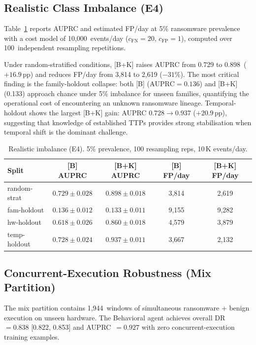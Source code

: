 \documentclass[journal]{IEEEtran}
\begin{document}
\subsection{Realistic Class Imbalance (E4)}
\label{subsec:e4}

Table~\ref{tab:imbalance} reports AUPRC and estimated FP/day at 5\% ransomware prevalence
with a cost model of 10,000~events/day ($c_{\mathrm{FN}}=20$, $c_{\mathrm{FP}}=1$),
computed over 100~independent resampling repetitions.

Under random-stratified conditions, {[}B{+}K{]} raises AUPRC from 0.729 to
0.898~($+16.9$\,pp) and reduces FP/day from 3,814 to 2,619 ($-31\%$).
The most critical finding is the family-holdout collapse: both {[}B{]}
($\mathrm{AUPRC}=0.136$) and {[}B{+}K{]} (0.133) approach chance under 5\% imbalance
for unseen families, quantifying the operational cost of encountering an unknown
ransomware lineage.
Temporal-holdout shows the largest {[}B{+}K{]} gain: AUPRC $0.728 \to 0.937$
($+20.9$\,pp), suggesting that knowledge of established TTPs provides strong
stabilisation when temporal shift is the dominant challenge.

\begin{table}[t]
\centering
\caption{Realistic imbalance (E4). 5\% prevalence, 100 resampling reps,
10\,K events/day.}
\label{tab:imbalance}
\setlength{\tabcolsep}{2.5pt}
\begin{tabular}{lcccc}
\toprule
\textbf{Split} & \textbf{{[}B{]} AUPRC} & \textbf{{[}B{+}K{]} AUPRC} &
\textbf{{[}B{]} FP/day} & \textbf{{[}B{+}K{]} FP/day} \\
\midrule
random-strat & $0.729{\pm}0.028$ & $\mathbf{0.898{\pm}0.018}$ & 3,814 & 2,619 \\
fam-holdout  & $0.136{\pm}0.012$ & $0.133{\pm}0.011$ & 9,155 & 9,282 \\
hw-holdout   & $0.618{\pm}0.026$ & $\mathbf{0.860{\pm}0.018}$ & 4,579 & 3,879 \\
temp-holdout & $0.728{\pm}0.024$ & $\mathbf{0.937{\pm}0.011}$ & 3,667 & 2,132 \\
\bottomrule
\end{tabular}
\end{table}

\subsection{Concurrent-Execution Robustness (Mix Partition)}
\label{subsec:mix}

The mix partition contains 1,944~windows of simultaneous ransomware + benign execution
on unseen hardware.
The Behavioral agent achieves overall DR~$= 0.838$ [0.822, 0.853] and AUPRC~$= 0.927$
with zero concurrent-execution training examples.
\end{document}

